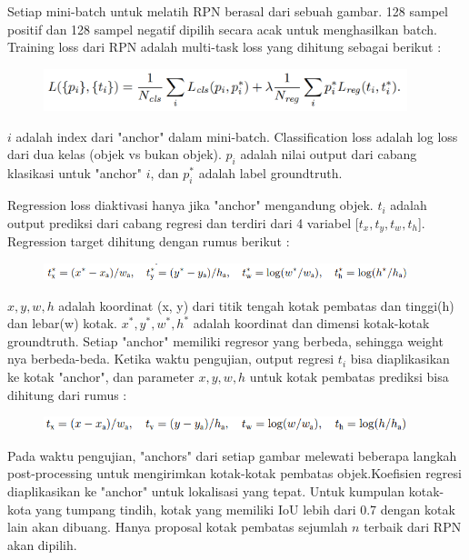 \documentclass{article}
\begin{document}
   	\par Setiap mini-batch untuk melatih RPN berasal dari sebuah gambar. 128 sampel positif dan 128 sampel negatif dipilih secara acak untuk menghasilkan batch. Training loss dari RPN adalah multi-task loss yang dihitung sebagai berikut : 
   
   	\begin{figure}[H]
   		\centering
   		\includegraphics[width=400px]{rumus/training_loss.png}
   	\end{figure}
   
   	$i$ adalah index dari "anchor" dalam mini-batch. Classification loss adalah log loss dari dua kelas (objek vs bukan objek). $p_{i}$ adalah nilai output dari cabang klasikasi untuk "anchor" $i$, dan $p_{i}^{*}$ adalah label groundtruth.
   	
   	\par Regression loss diaktivasi hanya jika "anchor" mengandung objek. $t_{i}$ adalah output prediksi dari cabang regresi dan terdiri dari 4 variabel [$t_{x}, t_{y}, t_{w}, t_{h}$]. Regression target dihitung dengan rumus berikut :
   	
   	\begin{figure}[H]
   		\centering
   		\includegraphics[width=400px]{rumus/regression_target.png}
   	\end{figure}
   
   	$x, y, w, h$ adalah koordinat (x, y) dari titik tengah kotak pembatas dan tinggi(h) dan lebar(w) kotak. $x^{*}, y^{*}, w^{*}, h^{*}$ adalah koordinat dan dimensi kotak-kotak groundtruth. Setiap "anchor" memiliki regresor yang berbeda, sehingga weight nya berbeda-beda. Ketika waktu pengujian, output regresi $t_{i}$ bisa diaplikasikan ke kotak "anchor", dan parameter $x, y, w, h$ untuk kotak pembatas prediksi bisa dihitung dari rumus :
   	
   	\begin{figure}[H]
   		\centering
   		\includegraphics[width=400px]{rumus/regression_target_2.png}
   	\end{figure}
   	
   	\par Pada waktu pengujian, "anchors" dari setiap gambar melewati beberapa langkah post-processing untuk mengirimkan kotak-kotak pembatas objek.Koefisien regresi diaplikasikan ke "anchor" untuk lokalisasi yang tepat. Untuk kumpulan kotak-kota yang tumpang tindih, kotak yang memiliki IoU lebih dari 0.7 dengan kotak lain akan dibuang. Hanya proposal kotak pembatas sejumlah $n$ terbaik dari RPN akan dipilih.
   	
\end{document}
